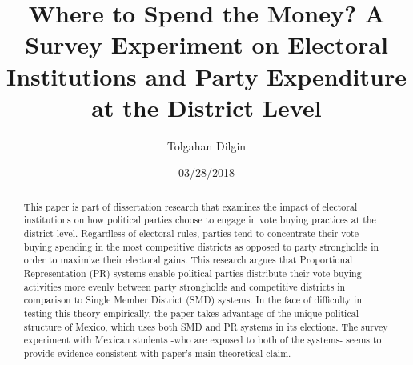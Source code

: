 \documentclass{article}
\begin{document}

	\title{Where to Spend the Money? A Survey Experiment on Electoral Institutions and Party Expenditure at the District Level}
	\author{Tolgahan Dilgin}
	\date{03/28/2018}
	\maketitle
	
\begin{abstract}
This paper is part of dissertation research that examines the impact of electoral institutions on how political parties choose to engage in vote buying practices at the district level. Regardless of electoral rules, parties tend to concentrate their vote buying spending in the most competitive districts as opposed to party strongholds in order to maximize their electoral gains. This research argues that Proportional Representation (PR) systems enable political parties distribute their vote buying activities more evenly between party strongholds and competitive districts in comparison to Single Member District (SMD) systems. In the face of difficulty in testing this theory empirically, the paper takes advantage of the unique political structure of Mexico, which uses both SMD and PR systems in its elections. The survey experiment with Mexican students -who are exposed to both of the systems- seems to provide evidence consistent with paper's main theoretical claim.
\end{abstract}
\end{document}
